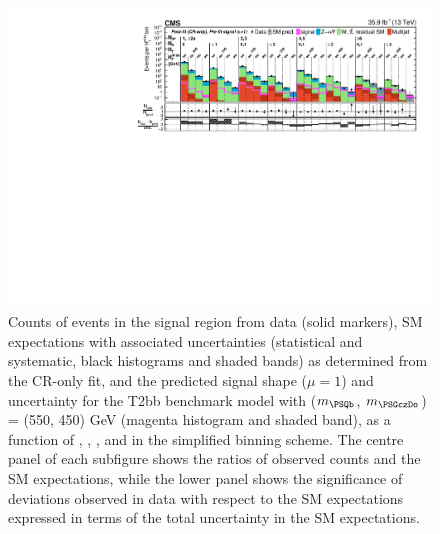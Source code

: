 \clearpage
\begin{figure}[p]
    \begin{center}
        \includegraphics[width=1.00\textwidth]{Supplementary/CMS-SUS-16-038_Figure-aux_027.pdf}
  \caption{Counts of events in the signal region from data (solid markers), SM expectations
    with associated uncertainties (statistical and systematic, black
    histograms and shaded bands) as determined from the CR-only fit,
    and the predicted signal shape ($\mu=1$) and uncertainty for the
        T2bb benchmark model with ($m_{\PSQb}$, $m_{\PSGczDo}$) = (550, 450) GeV
        (magenta histogram and shaded band),
    as a function of \njet, \nb, \scalht, and \mht in the simplified binning scheme.
    The centre panel of each subfigure shows the ratios of
    observed counts and the SM expectations, while the lower panel
    shows the significance of deviations observed in data with respect
    to the SM expectations expressed in terms of the total uncertainty
    in the SM expectations.  }
        \label{fig:T2bb_550_450_MR_sig}
    \end{center}
\end{figure}


